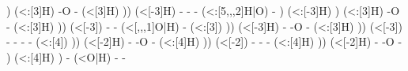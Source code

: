 \begin{struct}
{                                              )
                                              (<:[3]H)
                                            -\textcolor{O}{O}
                                            -
                                              (<[3]H)
                                          ))
                                            (<[-3]H)
                                          -
                                          -
                                          -
                                            (<:[5,,,2]\textcolor{O}{H}|\textcolor{O}{O})
                                          -
                                        )
                                          (<:[-3]H)
                                        )
                                        (<:[3]H)
                                      -\textcolor{O}{O}
                                      -
                                        (<:[3]H)
                                    ))
                                      (<[-3])
                                    -
                                    -
                                      (<[,,,1]\textcolor{O}{O}|\textcolor{O}{H})
                                    -
                                      (<:[3])
                                  ))
                                    (<[-3]H)
                                  -
                                  -\textcolor{O}{O}
                                  -
                                    (<:[3]H)
                                ))
                                  (<[-3])
                                -
                                -
                                -
                                -
                                  (<:[4])
                              ))
                                (<[-2]H)
                              -
                              -\textcolor{O}{O}
                              -
                                (<:[4]H)
                            ))
                              (<[-2])
                            -
                            -
                            -
                              (<:[4]H)
                          ))
                            (<[-2]H)
                          -
                          -\textcolor{O}{O}
                          -
                        )
                          (<:[4]H)
                        )
                      -
                        (<\textcolor{O}{O}|\textcolor{O}{H})
                      -
                      -
}
\end{struct}
